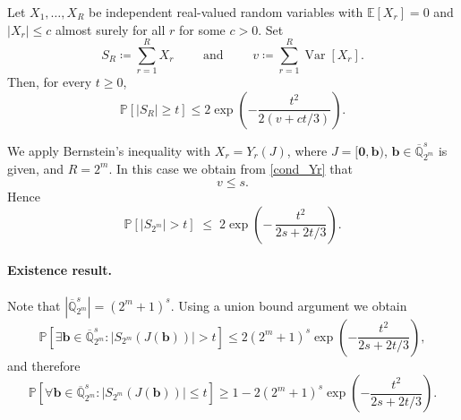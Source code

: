 \documentclass[12pt]{article}
\theoremstyle{definition}
\numberwithin{equation}{section}
\begin{document}
Let $X_1,\dots, X_R$ be independent real-valued random variables with $
\mathbb{E}[X_r] = 0$ and $|X_r | \le c$ almost surely for all $r$ for some $c > 0$. Set
\[
  S_R  \coloneqq \sum_{r=1}^R X_r
  \qquad \text{ and } \qquad  v \coloneqq \sum_{r=1}^R \operatorname{Var}[X_r].
\]
Then, for every $t \ge 0$,
\begin{equation*}
\mathbb{P}\left[ |S_R| \ge t \right] \le 2 \exp\left( - \frac{t^2}{2 (v+ct /3)} \right).
\end{equation*}

We apply Bernstein's inequality with $X_r=Y_r(J)$, where $J = [\bm{0}, \bm{b})$, $\bm{b} \in \overline{\mathbb{Q}}_{2^m}^s$ is given, and $R=2^m$. In this case we obtain from \eqref{cond_Yr} that \[v \le s.\]
Hence
\begin{equation*}
\mathbb{P}\left[|S_{2^m} | >t\right]
  \;\le\;
  2\exp\!\left(
    -\,\frac{t^2}{ 2s + 2 t /3}\right).
\end{equation*}

\paragraph{Existence result.} 
Note that $|\overline{\mathbb{Q}}_{2^m}^s|=(2^m+1)^s$. Using a union bound argument we obtain 
\begin{equation*}
\mathbb{P}\left[\exists \bm{b} \in \overline{\mathbb{Q}}_{2^m}^s : |S_{2^m}(J(\bm{b}))| > t \right] \le  2 (2^m+1)^s \exp\left( -\frac{t^2}{2s + 2 t / 3}  \right),%
\end{equation*}
and therefore
\begin{equation*}
\mathbb{P}\left[\forall \bm{b} \in \overline{\mathbb{Q}}_{2^m}^s: |S_{2^m}(J(\bm{b}))| \le t \right] \ge 1 -  2 (2^m+1)^s \exp\left( - \frac{t^2}{2s + 2 t /3} \right).%
\end{equation*}

\end{document}
